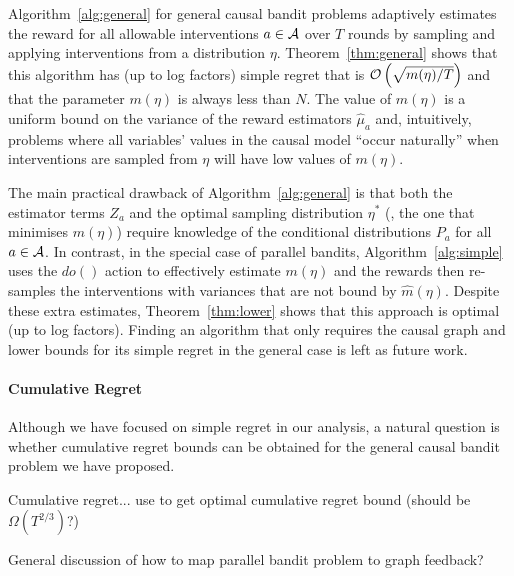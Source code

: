 Algorithm~\ref{alg:general} for general causal bandit problems adaptively estimates the reward for all allowable interventions $a \in \mathcal A$ over $T$ rounds by sampling and applying interventions from a distribution $\eta$.
Theorem~\ref{thm:general} shows that this algorithm has (up to log factors) simple regret that is $\mathcal{O}\left( \sqrt{m(\eta)/T} \right)$ and that the parameter $m(\eta)$ is always less than $N$.
The value of $m(\eta)$ is a uniform bound on the variance of the reward estimators $\hat{\mu}_a$ and, intuitively, problems where all variables' values in the causal model ``occur naturally'' when interventions are sampled from $\eta$ will have low values of $m(\eta)$.

The main practical drawback of Algorithm~\ref{alg:general} is that both the estimator terms $Z_a$ and the optimal sampling distribution $\eta^*$ (\ie, the one that minimises $m(\eta)$) require knowledge of the conditional distributions $P_a$ for all $a \in \mathcal A$.
In contrast, in the special case of parallel bandits, Algorithm~\ref{alg:simple} uses the $do()$ action to effectively estimate $m(\eta)$ and the rewards then re-samples the interventions with variances that are not bound by $\hat{m}(\eta)$.
Despite these extra estimates, Theorem~\ref{thm:lower} shows that this approach is optimal (up to log factors).
Finding an algorithm that only requires the causal graph and lower bounds for its simple regret in the general case is left as future work.

\paragraph{Cumulative Regret}
Although we have focused on simple regret in our analysis, a natural question is whether cumulative regret bounds can be obtained for the general causal bandit problem we have proposed.

Cumulative regret... use \citep{wu2015online} to get optimal cumulative regret bound (should be $\Omega(T^{2/3})$?)

General discussion of how to map parallel bandit problem to graph feedback?

